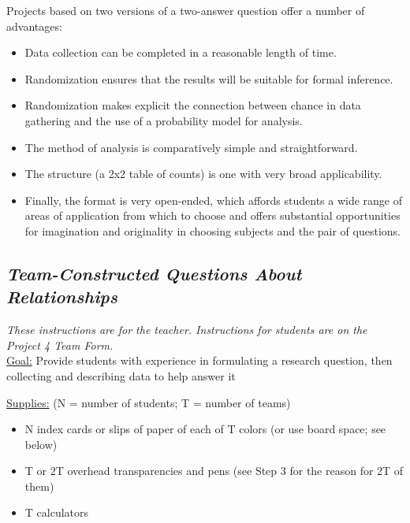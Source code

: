 \documentclass[twoside,openany]{tufte-book}
\begin{document}
Projects based on two versions of a two-answer question offer a number of advantages:  
\renewcommand{\labelitemi}{$\filledsquare$}
\begin{itemize}[leftmargin=1cm, itemsep=.2em]
\item Data collection can be completed in a reasonable length of time.
\item Randomization ensures that the results will be suitable for formal inference.
\item Randomization makes explicit the connection between chance in data gathering and the use of a probability model for analysis.
\item The method of analysis is comparatively simple and straightforward.
\item The structure (a 2x2 table of counts) is one with very broad applicability.
\item Finally, the format is very open-ended, which affords students a wide range of areas of application from which to choose and offers substantial opportunities for imagination and originality in choosing subjects and the pair of questions.
\end{itemize}

\newpage

\subsection{\textbf{\textit{Team-Constructed Questions About Relationships}}}

\textit{These instructions are for the teacher. Instructions for students are on the Project 4 Team Form.}\\
\vspace{10pt}
\noindent\underline{Goal:} Provide students with experience in formulating a research question, then collecting and describing data to help answer it\\
\vspace{10pt}

\noindent\underline{Supplies:} (N = number of students; T = number of teams)
\begin{itemize}[leftmargin=1cm, itemsep=.2em]
\item N index cards or slips of paper of each of T colors (or use board space; see below)
\item T or 2T overhead transparencies and pens (see Step 3 for the reason for 2T of them)
\item T calculators
\end{itemize}
\end{document}
